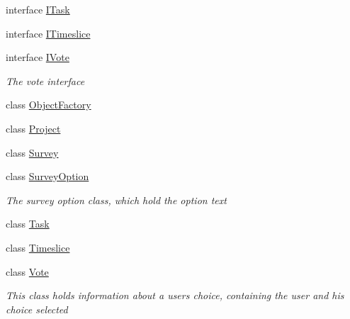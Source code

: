 \begin{DoxyCompactItemize}
interface \hyperlink{interface_plex_byte_1_1_mo_cap_1_1_interactions_1_1_i_task}{I\+Task}
\item 
interface \hyperlink{interface_plex_byte_1_1_mo_cap_1_1_interactions_1_1_i_timeslice}{I\+Timeslice}
\item 
interface \hyperlink{interface_plex_byte_1_1_mo_cap_1_1_interactions_1_1_i_vote}{I\+Vote}
\begin{DoxyCompactList}\small\item\em The vote interface \end{DoxyCompactList}\item 
class \hyperlink{class_plex_byte_1_1_mo_cap_1_1_interactions_1_1_object_factory}{Object\+Factory}
\item 
class \hyperlink{class_plex_byte_1_1_mo_cap_1_1_interactions_1_1_project}{Project}
\item 
class \hyperlink{class_plex_byte_1_1_mo_cap_1_1_interactions_1_1_survey}{Survey}
\item 
class \hyperlink{class_plex_byte_1_1_mo_cap_1_1_interactions_1_1_survey_option}{Survey\+Option}
\begin{DoxyCompactList}\small\item\em The survey option class, which hold the option text \end{DoxyCompactList}\item 
class \hyperlink{class_plex_byte_1_1_mo_cap_1_1_interactions_1_1_task}{Task}
\item 
class \hyperlink{class_plex_byte_1_1_mo_cap_1_1_interactions_1_1_timeslice}{Timeslice}
\item 
class \hyperlink{class_plex_byte_1_1_mo_cap_1_1_interactions_1_1_vote}{Vote}
\begin{DoxyCompactList}\small\item\em This class holds information about a users choice, containing the user and his choice selected \end{DoxyCompactList}\end{DoxyCompactItemize}
